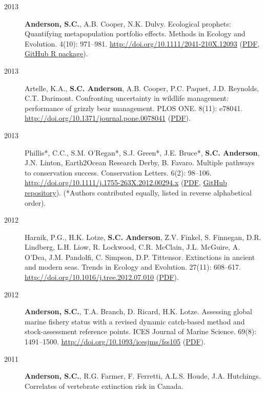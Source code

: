 \begin{description}
\item[2013]
\textbf{Anderson, S.C.}, A.B. Cooper, N.K. Dulvy. Ecological prophets:
Quantifying metapopulation portfolio effects. Methods in Ecology and
Evolution. 4(10): 971--981. \url{http://doi.org/10.1111/2041-210X.12093}
(\href{https://dl.dropboxusercontent.com/u/254940/papers/Anderson_etal_2013_ecological_prophets_with_SOM.pdf}{PDF},
\href{https://github.com/seananderson/ecofolio}{GitHub R package}).
\item[2013]
Artelle, K.A., \textbf{S.C. Anderson}, A.B. Cooper, P.C. Paquet, J.D.
Reynolds, C.T. Darimont. Confronting uncertainty in wildlife management:
performance of grizzly bear management. PLOS ONE. 8(11): e78041.
\url{http://doi.org/10.1371/journal.pone.0078041}
(\href{http://www.plosone.org/article/fetchObject.action?uri=info\%3Adoi\%2F10.1371\%2Fjournal.pone.0078041\&representation=PDF}{PDF}).
\item[2013]
Phillis*, C.C., S.M. O'Regan*, S.J. Green*, J.E. Bruce*, \textbf{S.C.
Anderson}, J.N. Linton, Earth2Ocean Research Derby, B. Favaro. Multiple
pathways to conservation success. Conservation Letters. 6(2): 98--106.
\url{http://doi.org/10.1111/j.1755-263X.2012.00294.x}
(\href{https://dl.dropboxusercontent.com/u/254940/papers/Phillis_etal_2012_Multiple_pathways_to_conservation_success.pdf}{PDF},
\href{https://github.com/seananderson/conservation_pathways}{GitHub
repository}). (*Authors contributed equally, listed in reverse
alphabetical order).
\item[2012]
Harnik, P.G., H.K. Lotze, \textbf{S.C. Anderson}, Z.V. Finkel, S.
Finnegan, D.R. Lindberg, L.H. Liow, R. Lockwood, C.R. McClain, J.L.
McGuire, A. O'Dea, J.M. Pandolfi, C. Simpson, D.P. Tittensor.
Extinctions in ancient and modern seas. Trends in Ecology and Evolution.
27(11): 608--617. \url{http://doi.org/10.1016/j.tree.2012.07.010}
(\href{https://dl.dropboxusercontent.com/u/254940/papers/Harnik_etal_2012_Extinctions_in_ancient_and_modern_seas.pdf}{PDF}).
\item[2012]
\textbf{Anderson, S.C.}, T.A. Branch, D. Ricard, H.K. Lotze. Assessing
global marine fishery status with a revised dynamic catch-based method
and stock-assessment reference points. ICES Journal of Marine Science.
69(8): 1491--1500. \url{http://doi.org/10.1093/icesjms/fss105}
(\href{http://icesjms.oxfordjournals.org/cgi/reprint/fss105?ijkey=pFRzMGEDycomI3X\&keytype=ref}{PDF}).
\item[2011]
\textbf{Anderson, S.C.}, R.G. Farmer, F. Ferretti, A.L.S. Houde, J.A.
Hutchings. Correlates of vertebrate extinction risk in Canada.

\end{description}
